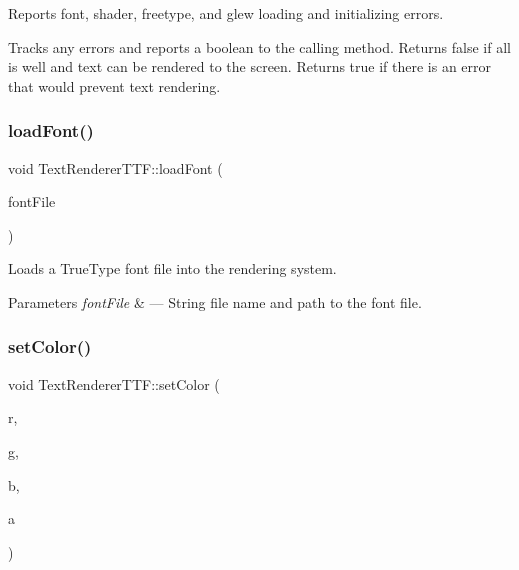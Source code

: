 Reports font, shader, freetype, and glew loading and initializing errors. 

Tracks any errors and reports a boolean to the calling method. Returns false if all is well and text can be rendered to the screen. Returns true if there is an error that would prevent text rendering. \mbox{\label{class_text_renderer_t_t_f_aedfacf050040104b67f45e1c6f86b12d}} 
\subsubsection{\texorpdfstring{load\+Font()}{loadFont()}}
{\footnotesize\ttfamily void Text\+Renderer\+T\+T\+F\+::load\+Font (\begin{DoxyParamCaption}\item[{std\+::string}]{font\+File }\end{DoxyParamCaption})}



Loads a True\+Type font file into the rendering system. 


\begin{DoxyParams}{Parameters}
{\em font\+File} & --- String file name and path to the font file. \\
\hline
\end{DoxyParams}
\mbox{\label{class_text_renderer_t_t_f_aef124230f4c3564b097ed844e052a2ce}} 
\subsubsection{\texorpdfstring{set\+Color()}{setColor()}\hspace{0.1cm}{\footnotesize\ttfamily [1/2]}}
{\footnotesize\ttfamily void Text\+Renderer\+T\+T\+F\+::set\+Color (\begin{DoxyParamCaption}\item[{G\+Lfloat}]{r,  }\item[{G\+Lfloat}]{g,  }\item[{G\+Lfloat}]{b,  }\item[{G\+Lfloat}]{a }\end{DoxyParamCaption})}



